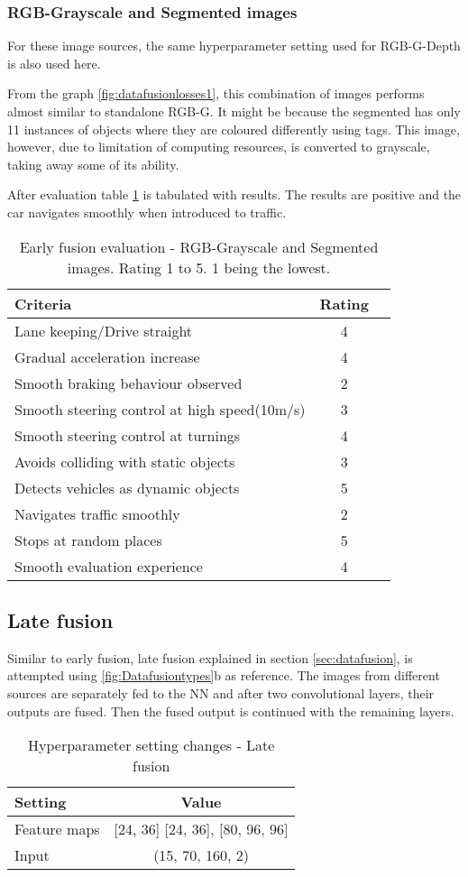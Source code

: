 \subsubsection*{RGB-Grayscale and Segmented images}
For these image sources, the same hyperparameter setting used for RGB-G-Depth is also used
here.

From the graph \ref{fig:datafusionlosses1}, this combination of images performs almost
similar to standalone RGB-G. It might be because the segmented has only 11 instances of
objects where they are coloured differently using tags. This image, however, due to
limitation of computing resources, is converted to grayscale, taking away some of its
ability.

After evaluation table \ref{table:earlyfusionrgbseg} is tabulated with results. The
results are positive and the car navigates smoothly when introduced to traffic.
\begin{table}[!ht]
    \centering
\begin{tabular}{lcc}
    \toprule
    Criteria & Rating \\\midrule
    Lane keeping/Drive straight  & 4  \\
    Gradual acceleration increase  & 4\\
    Smooth braking behaviour observed & 2 \\
    Smooth steering control at high speed(10m/s) & 3 \\
    Smooth steering control at turnings & 4\\
    Avoids colliding with static objects & 3 \\
    Detects vehicles as dynamic objects & 5 \\
    Navigates traffic smoothly & 2\\
    Stops at random places& 5 \\
    Smooth evaluation experience & 4 \\\bottomrule
\end{tabular}
\caption{Early fusion evaluation - RGB-Grayscale and Segmented images. Rating 1 to 5. 1
being the lowest.}
\label{table:earlyfusionrgbseg}
\end{table}

\subsection{Late fusion}
Similar to early fusion, late fusion explained in section \ref{sec:datafusion}, is attempted
using \ref{fig:Datafusiontypes}b as reference. The images from different sources
are separately fed to the NN and after two convolutional layers,
their outputs are fused. Then the fused output is continued with the remaining layers.
\begin{table}[!ht]
    \centering
\begin{tabular}{lc}
    \toprule
    Setting  & Value  \\\midrule
    Feature maps  & [24, 36] [24, 36], [80, 96, 96]  \\
    Input  & (15, 70, 160, 2)\\\bottomrule
\end{tabular}
\caption{Hyperparameter setting changes - Late fusion}
\label{table:paramsLF}
\end{table}

